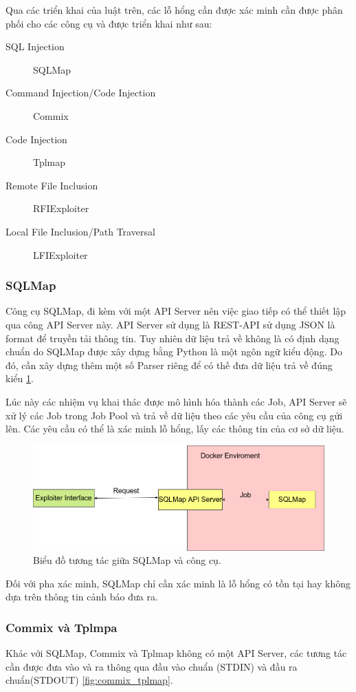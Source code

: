 \documentclass[./../main.tex]{subfiles}
\begin{document}
Qua các triển khai của luật trên, các lỗ hổng cần được xác minh cần được
phân phối cho các công cụ và được triển khai như sau:
\begin{description}
	\item[SQL Injection] SQLMap
	\item [Command Injection/Code Injection] Commix
	\item [Code Injection] Tplmap
	\item [Remote File Inclusion] RFIExploiter
	\item [Local File Inclusion/Path Traversal] LFIExploiter
\end{description}

\subsubsection{SQLMap}
Công cụ SQLMap, đi kèm với một API Server nên việc giao tiếp có thể thiết
lập qua công API Server này. API Server sử dụng là REST-API sử dụng JSON
là format để truyền tải thông tin. Tuy nhiên dữ liệu trả về không là có
định dạng chuẩn do SQLMap được xây dựng bằng Python là một ngôn ngữ kiểu
động. Do đó, cần xây dựng thêm một số Parser riêng để có thế đưa dữ liệu
trả về đúng kiểu \ref{fig:sqlmap}.

Lúc này các nhiệm vụ khai thác được mô hình hóa thành các Job, API Server
sẽ xử lý các Job trong Job Pool và trả về dữ liệu theo các yêu cầu của công
cụ gửi lên. Các yêu cầu có thể là xác minh lỗ hổng, lấy các thông tin của
cơ sở dữ liệu.


\begin{figure}[h!]
	\includegraphics[width=\linewidth]{./images/SQLMap.png}
	\caption{Biểu đồ tương tác giữa SQLMap và công cụ.}
	\label{fig:sqlmap}
\end{figure}

Đối với pha xác minh, SQLMap chỉ cần xác minh là lỗ hổng có tồn tại
hay không dựa trên thông tin cảnh báo đưa ra.
\subsubsection{Commix và Tplmpa}
Khác với SQLMap, Commix và Tplmap không có một API Server, các tương
tác cần được đưa vào và ra thông qua đầu vào chuẩn (STDIN) và đầu ra
chuẩn(STDOUT) \ref{fig:commix_tplmap}.
\end{document}

